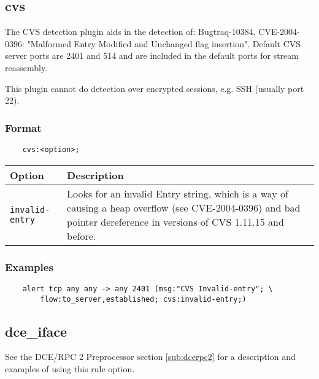 \documentclass[english]{report}
\newenvironment{note}{
\samepage
    \vspace{10pt}{\textsf{
        {\hspace{7pt}\Huge{$\triangle$\hspace{-12.5pt}{\Large{$^!$}}}}\hspace{5pt}
        {\Large{NOTE}}
    }
    }
   \begin{center}
    \par\vspace{-17pt}

    \begin{lrbox}{\savepar}
    \begin{minipage}[r]{6in}
}
{
    \end{minipage}
    \end{lrbox}
    \fbox{
        \usebox{
            \savepar
	}
    }
    \par\vskip10pt
    \end{center}
}
\newenvironment{note}{
        \begin{rawhtml}
        <p><table border="1"><tr><td><b>
        Note:&nbsp;&nbsp;</b>
        \end{rawhtml}
}{
        \begin{rawhtml}
        </b></td></tr></table></p>
        \end{rawhtml}
}
\begin{document}
\subsection{cvs}

The CVS detection plugin aids in the detection of: Bugtraq-10384,
CVE-2004-0396: "Malformed Entry Modified and Unchanged flag insertion".
Default CVS server ports are 2401 and 514 and are included in the default ports
for stream reassembly.

\begin{note}

This plugin cannot do detection over encrypted sessions, e.g. SSH (usually port
22).

\end{note}

\subsubsection{Format}

\begin{verbatim}
    cvs:<option>;
\end{verbatim}

\begin{tabular}{| l | p{4.5in} |}
\hline
{\bf Option} & {\bf Description}\\
\hline

\hline
\texttt{invalid-entry} &

Looks for an invalid Entry string, which is a way of causing a heap overflow
(see CVE-2004-0396) and bad pointer dereference in versions of CVS 1.11.15 and
before.\\

\hline
\end{tabular}

\subsubsection{Examples}

\begin{verbatim}
    alert tcp any any -> any 2401 (msg:"CVS Invalid-entry"; \
        flow:to_server,established; cvs:invalid-entry;)
\end{verbatim}

\subsection{dce\_iface}

See the DCE/RPC 2 Preprocessor section \ref{sub:dcerpc2} for a description and
examples of using this rule option.
\end{document}
